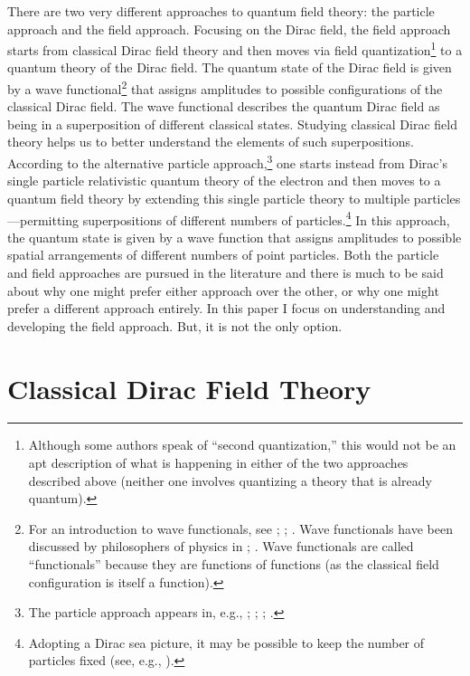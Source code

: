 \documentclass[12pt,secnumarabic,amsmath,amssymb,balancelastpage,nofootinbib]{article}
\begin{document}
There are two very different approaches to quantum field theory: the particle approach and the field approach.  Focusing on the Dirac field, the field approach starts from classical Dirac field theory and then moves via field quantization\footnote{Although some authors speak of ``second quantization,'' this would not be an apt description of what is happening in either of the two approaches described above (neither one involves quantizing a theory that is already quantum).} to a quantum theory of the Dirac field.  The quantum state of the Dirac field is given by a wave functional\footnote{For an introduction to wave functionals, see \citet{jackiw1988, jackiw1990, hatfield}; \citet[ch.\ 11]{bohmhiley}; \citet[sec.\ 12.4]{holland}.  Wave functionals have been discussed by philosophers of physics in \citet{huggett2000, wallace2001, wallace2006, wallace2017, baker2009}; \citet[sec.\ 4.3.1]{myrvold2015}.  Wave functionals are called ``functionals'' because they are functions of functions (as the classical field configuration is itself a function).} that assigns amplitudes to possible configurations of the classical Dirac field.  The wave functional describes the quantum Dirac field as being in a superposition of different classical states.  Studying classical Dirac field theory helps us to better understand the elements of such superpositions.  According to the alternative particle approach,\footnote{The particle approach appears in, e.g., \citet[ch.\ 6--8]{schweberQFT}; \citet[sec.\ 13.2]{bjorkendrellfields}; \citet{thaller1992}; \citet[ch.\ 3]{teller}.} one starts instead from Dirac's single particle relativistic quantum theory of the electron and then moves to a quantum field theory by extending this single particle theory to multiple particles---permitting superpositions of different numbers of particles.\footnote{Adopting a Dirac sea picture, it may be possible to keep the number of particles fixed (see, e.g., \citealp{deckert}).}  In this approach, the quantum state is given by a wave function that assigns amplitudes to possible spatial arrangements of different numbers of point particles.   Both the particle and field approaches are pursued in the literature and there is much to be said about why one might prefer either approach over the other, or why one might prefer a different approach entirely.  In this paper I focus on understanding and developing the field approach.  But, it is not the only option.





\section{Classical Dirac Field Theory}\label{CDFT}
\end{document}
